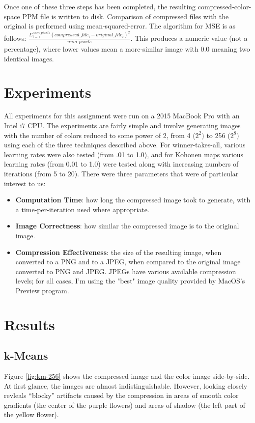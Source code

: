 \documentclass[letter,11pt,titlepage]{article}
\begin{document}
Once one of these three steps has been completed, the resulting compressed-color-space PPM file is written to disk. Comparison of compressed files with the original is performed using mean-squared-error\cite{MSE}. The algorithm for MSE is as follows: \(\frac{\Sigma_{i=1}^{num\_pixels}(compressed\_file_i - original\_file_i)^2}{num\_pixels}\). This produces a numeric value (not a percentage), where lower values mean a more-similar image with 0.0 meaning two identical images. 

\section{Experiments}
All experiments for this assignment were run on a 2015 MacBook Pro with an Intel i7 CPU. The experiments are fairly simple and involve generating images with the number of colors reduced to some power of 2, from 4 (\(2^2)\) to 256 (\(2^8)\) using each of the three techniques described above. For winner-takes-all, various learning rates were also tested (from .01 to 1.0), and for Kohonen maps various learning rates (from 0.01 to 1.0) were tested along with increasing numbers of iterations (from 5 to 20). There were three parameters that were of particular interest to us:

\begin{itemize}
    \item \textbf{Computation Time}: how long the compressed image took to generate, with a time-per-iteration used where appropriate.
    \item \textbf{Image Correctness}: how similar the compressed image is to the original image.
    \item \textbf{Compression Effectiveness}: the size of the resulting image, when converted to a PNG and to a JPEG, when compared to the original image converted to PNG and JPEG. JPEGs have various available compression levels; for all cases, I'm using the "best" image quality provided by MacOS's Preview program.
\end{itemize}

\section{Results}
\subsection{k-Means}

Figure \ref{fig:km-256} shows the compressed image and the color image side-by-side. At first glance, the images are almost indistinguishable. However, looking closely revleals ``blocky'' artifacts caused by the compression in areas of smooth color gradients (the center of the purple flowers) and areas of shadow (the left part of the yellow flower).
\end{document}
